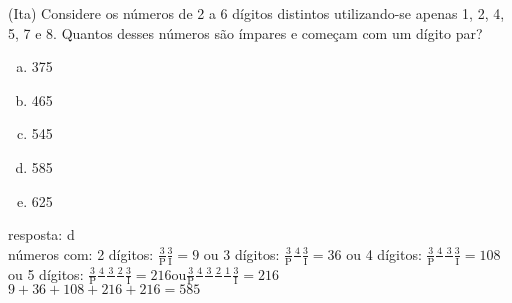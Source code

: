 \begin{ex}
 (Ita) Considere os números de 2 a 6 dígitos distintos utilizando-se apenas 1, 2, 4, 5, 7 e 8. Quantos desses números são ímpares e começam com um dígito par?
    \begin{enumerate}[(a)]
    \item 375
    \item 465
    \item 545
    \item 585
    \item 625
    \end{enumerate}
      \begin{sol}
     resposta: d \\
     números com:  
     2 dígitos: $\frac{3}{\mathrm{P}}\frac{3}{\mathrm{I}}= 9$\hspace{0.2cm} ou \hspace{0.2cm}      3 dígitos:  $\frac{3}{\mathrm{P}}\frac{4}{\phantom{A}}\frac{3}{\mathrm{I}}=36$\hspace{0.2cm} ou 
     4 dígitos: $\frac{3}{\mathrm{P}}\frac{4}{\phantom{A}} \frac{3}{\phantom{A}}\frac{3}{\mathrm{I}}=108$\hspace{0.2cm} ou\hspace{0.2 cm} 5 dígitos: $\frac{3}{\mathrm{P}}\frac{4}{\phantom{A}}\frac{3}{\phantom{A}}\frac{2}{\phantom{A}}\frac{3}{\mathrm{I}}= 216$\hspace{0.2cm}ou\hspace{0.2cm}$\frac{3}{\mathrm{P}}\frac{4}{\phantom{A}}\frac{3}{\phantom{A}}\frac{2}{\phantom{A}}\frac{1}{\phantom{A}}\frac{3}{\mathrm{I}}= 216$\\
     $9+36+108+216+216 = 585$
      \end{sol}
\end{ex}